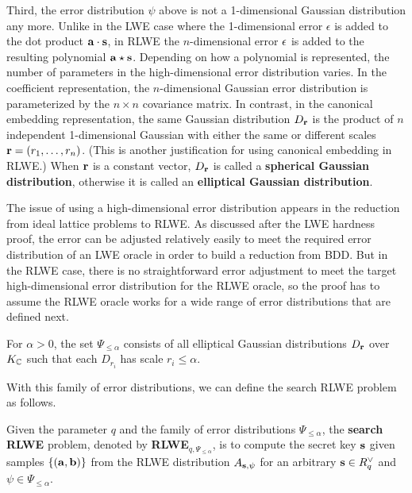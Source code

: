 \documentclass[../main.tex]{subfiles}
\begin{document}
Third, the error distribution $\psi$ above is not a 1-dimensional Gaussian distribution any more. Unlike in the LWE case where the 1-dimensional error $\epsilon$ is added to the dot product $\mathbf{a}\cdot \mathbf{s}$, in RLWE the $n$-dimensional error $\mathbf{\epsilon}$ is added to the resulting polynomial $\mathbf{a}\star \mathbf{s}$. Depending on how a polynomial is represented, the number of parameters in the high-dimensional error distribution varies. In the coefficient representation, the $n$-dimensional Gaussian error distribution is parameterized by the $n \times n$ covariance matrix. In contrast, in the canonical embedding representation, the same Gaussian distribution  $D_{\mathbf{r}}$ is the product of $n$ independent 1-dimensional Gaussian with either the same or different scales $\mathbf{r}=(r_1, \dots, r_n)$. (This is another justification for using canonical embedding in RLWE.) When $\mathbf{r}$ is a constant vector, $D_{\mathbf{r}}$ is called a \textbf{spherical Gaussian distribution}, otherwise it is called an \textbf{elliptical Gaussian distribution}. %

The issue of using a high-dimensional error distribution appears in the reduction from ideal lattice problems to RLWE. As discussed after the LWE hardness proof, the error can be adjusted relatively easily to meet the required error distribution of an LWE oracle in order to build a reduction from BDD. But in the RLWE case, there is no straightforward error adjustment to meet the target high-dimensional error distribution for the RLWE oracle, so the proof has to assume the RLWE oracle works for a wide range of error distributions that are defined next. 

\begin{definition}
For $\alpha > 0$, the set $\Psi_{\le \alpha}$ consists of all elliptical Gaussian distributions $D_{\mathbf{r}}$ over $K_{\mathbb{C}}$ such that each $D_{r_i}$ has scale $r_i \le \alpha$.
\end{definition}

With this family of error distributions, we can define the search RLWE problem as follows.

\begin{definition}
\reversemarginpar
{}
Given the parameter $q$ and the family of error distributions $\Psi_{\le \alpha}$, the \textbf{search RLWE} problem, denoted by \textbf{RLWE$_{q,\Psi_{\le \alpha}}$}, is to compute the secret key $\mathbf{s}$  given samples $\{(\mathbf{a}, \mathbf{b})\}$ from the RLWE distribution $A_{\mathbf{s},\psi}$ for an arbitrary $\mathbf{s} \in R^{\vee}_q$ and $\psi \in \Psi_{\le \alpha}$.
\end{definition}
\end{document}
